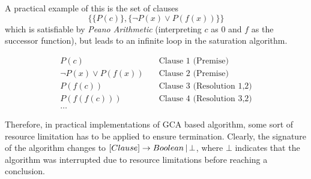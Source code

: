 A practical example of this is the set of clauses
\begin{equation}\label{eq:non_terminating}
  \{ \{P(c)\}, \{\neg P(x) \lor P(f(x))\} \}
\end{equation}
which is satisfiable by \emph{Peano Arithmetic} (interpreting \(c\) as \(0\) and \(f\) as the successor function), but leads to an infinite loop in the saturation algorithm.

\begin{equation}
   \begin{aligned}
    P(c) &\quad \text{Clause 1 (Premise)} \\
    \neg P(x) \lor P(f(x)) &\quad \text{Clause 2 (Premise)} \\
    P(f(c)) &\quad \text{Clause 3 (Resolution 1,2)} \\
    P(f(f(c))) &\quad \text{Clause 4 (Resolution 3,2)} \\
    \ldots
  \end{aligned}
\end{equation}

Therefore, in practical implementations of GCA based algorithm, some sort of resource limitation has to be applied to ensure termination.
Clearly, the signature of the algorithm changes to \([Clause] \to Boolean \,|\, \bot\), where \(\bot\) indicates that the algorithm was interrupted due to resource limitations before reaching a conclusion.

